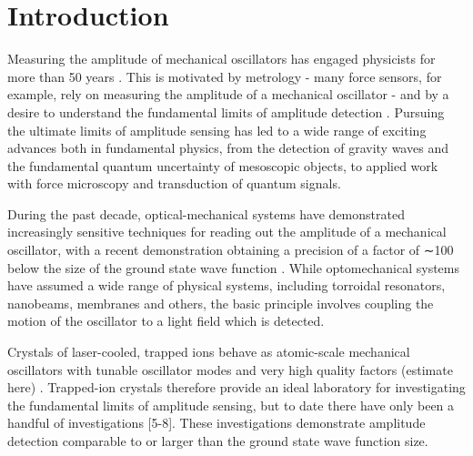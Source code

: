 \documentclass[aps,prl,twocolumn,superscriptaddress,floatfix]{revtex4-1}
\begin{document}


\section{Introduction}
Measuring the amplitude of mechanical oscillators has engaged physicists for more than 50 years \citep{Weber1966}. This is motivated by metrology - many force sensors, for example, rely on measuring the amplitude of a mechanical oscillator - and by a desire to understand the fundamental limits of amplitude detection \citep{Caves1980}. Pursuing the ultimate limits of amplitude sensing has led to a wide range of exciting advances both in fundamental physics, from the detection of gravity waves and the fundamental quantum uncertainty of mesoscopic objects, to applied work with force microscopy and transduction of quantum signals. 

During the past decade, optical-mechanical systems have demonstrated increasingly sensitive techniques for reading out the amplitude of a mechanical oscillator, with a recent demonstration obtaining a precision of a factor of ∼100 below the size of the ground state wave function \citep{Wilson2014a}. While optomechanical systems have assumed a wide range of physical systems, including torroidal resonators, nanobeams, membranes and others, the basic principle involves coupling the motion of the oscillator to a light field which is detected.

Crystals of laser-cooled, trapped ions behave as atomic-scale mechanical oscillators \citep{Jost2009,Biercuk2010a,Sawyer2012} with tunable oscillator modes and very high quality factors (estimate here) \citep{Biercuk2010a,Sawyer2012,Shaniv2016,Ivanov2016a,Knunz2010}. Trapped-ion crystals therefore provide an ideal laboratory for investigating the fundamental limits of amplitude sensing, but to date there have only been a handful of investigations [5-8]. These investigations demonstrate amplitude detection comparable to or larger than the ground state wave function size.
\end{document}
